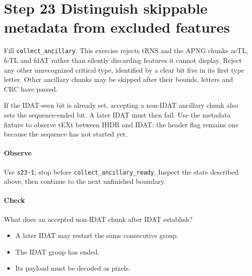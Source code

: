 \section{Step 23 Distinguish skippable metadata from excluded features}\label{png-collect-s23}
Fill \texttt{collect\_ancillary}. This exercise rejects tRNS and the APNG chunks acTL, fcTL and fdAT rather than silently discarding features it cannot display. Reject any other unrecognized critical type, identified by a clear bit five in its first type letter. Other ancillary chunks may be skipped after their bounds, letters and CRC have passed.

If the IDAT-seen bit is already set, accepting a non-IDAT ancillary chunk also sets the sequence-ended bit. A later IDAT must then fail. Use the metadata fixture to observe tEXt between IHDR and IDAT: the header flag remains one because the sequence has not started yet.

\paragraph{Observe} Use \texttt{s23-1}; stop before \texttt{collect\_ancillary\_ready}. Inspect the state described above, then continue to the next unfinished boundary.

\paragraph{Check} What does an accepted non-IDAT chunk after IDAT establish?
\begin{itemize}
\item[A.] A later IDAT may restart the same consecutive group.
\item[B.] The IDAT group has ended.
\item[C.] Its payload must be decoded as pixels.
\end{itemize}
